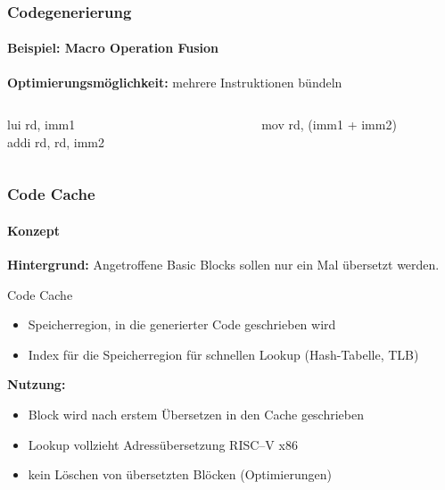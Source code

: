 \begin{frame}
	\frametitle{Codegenerierung}
	\framesubtitle{Beispiel: Macro Operation Fusion}
	
	\textbf{Optimierungsmöglichkeit:} mehrere Instruktionen bündeln
	
	\vspace{2cm}
	
	\begin{columns}[onlytextwidth]
		\ttfamily
		\begin{column}{0.45\textwidth}
			\centering
			lui rd, imm1\\
			addi rd, rd, imm2
		\end{column}
		
		\begin{column}{0.05\textwidth}
			\centering
			\conclude
		\end{column}
		
		\begin{column}{0.45\textwidth}
			\centering
			mov rd, (imm1 + imm2)
		\end{column}
	\end{columns}
\end{frame}


\begin{frame}
	\frametitle{Code Cache}
	\framesubtitle{Konzept}
	
	\textbf{Hintergrund:} Angetroffene Basic Blocks sollen nur ein Mal übersetzt werden.
	
	\vspace{0.50cm}
	
	\pause
	\begin{block}{Code Cache}
		\begin{itemize}
			\item Speicherregion, in die generierter Code geschrieben wird
			\item Index für die Speicherregion für schnellen Lookup ( Hash-Tabelle, TLB)
		\end{itemize}
	\end{block}
	
	\vspace{0.50cm}
	
	\pause
	\textbf{Nutzung:}
	
	\begin{itemize}
		\item Block wird nach erstem Übersetzen in den Cache geschrieben
		\item Lookup vollzieht Adressübersetzung RISC--V  x86
		\item kein Löschen von übersetzten Blöcken ( Optimierungen)
	\end{itemize}
\end{frame}

